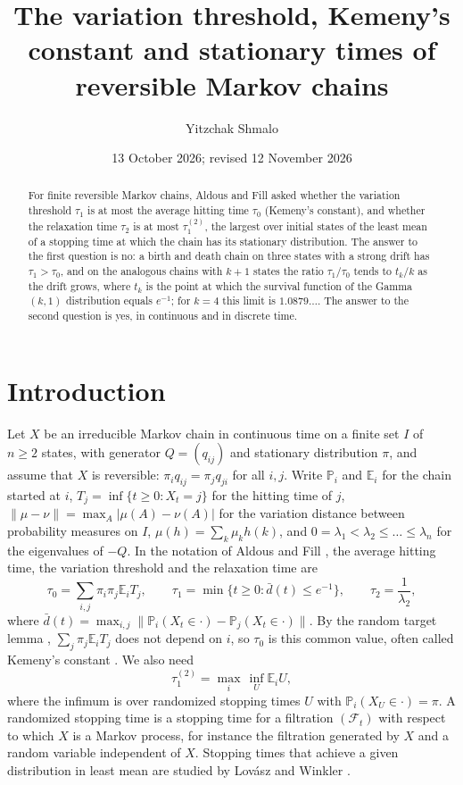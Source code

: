 \documentclass[11pt]{amsart}
\title[The variation threshold and stationary times]{The variation threshold, Kemeny's constant and stationary times of reversible Markov chains}
\author{Yitzchak Shmalo}
\date{13 October 2026; revised 12 November 2026}
\numberwithin{equation}{section}
\newcommand{\Pp}{\mathbb P}
\newcommand{\E}{\mathbb E}
\newcommand{\dbar}{\bar d}
\begin{document}
\begin{abstract}
For finite reversible Markov chains, Aldous and Fill asked whether the variation threshold $\tau_1$ is at most the average hitting time $\tau_0$ (Kemeny's constant), and whether the relaxation time $\tau_2$ is at most $\tau_1^{(2)}$, the largest over initial states of the least mean of a stopping time at which the chain has its stationary distribution. The answer to the first question is no: a birth and death chain on three states with a strong drift has $\tau_1>\tau_0$, and on the analogous chains with $k+1$ states the ratio $\tau_1/\tau_0$ tends to $t_k/k$ as the drift grows, where $t_k$ is the point at which the survival function of the Gamma$(k,1)$ distribution equals $e^{-1}$; for $k=4$ this limit is $1.0879\ldots$. The answer to the second question is yes, in continuous and in discrete time.
\end{abstract}
\maketitle

\section{Introduction}

Let $X$ be an irreducible Markov chain in continuous time on a finite set $I$ of $n\ge2$ states, with generator $Q=(q_{ij})$ and stationary distribution $\pi$, and assume that $X$ is reversible: $\pi_iq_{ij}=\pi_jq_{ji}$ for all $i,j$. Write $\Pp_i$ and $\E_i$ for the chain started at $i$, $T_j=\inf\{t\ge0:X_t=j\}$ for the hitting time of $j$, $\|\mu-\nu\|=\max_A|\mu(A)-\nu(A)|$ for the variation distance between probability measures on $I$, $\mu(h)=\sum_k\mu_kh(k)$, and $0=\lambda_1<\lambda_2\le\dots\le\lambda_n$ for the eigenvalues of $-Q$. In the notation of Aldous and Fill \cite[Chapter~4]{AF}, the average hitting time, the variation threshold and the relaxation time are
\[
\tau_0=\sum_{i,j}\pi_i\pi_j\E_iT_j,\qquad \tau_1=\min\{t\ge0:\dbar(t)\le e^{-1}\},\qquad \tau_2=\frac1{\lambda_2},
\]
where $\dbar(t)=\max_{i,j}\|\Pp_i(X_t\in\cdot)-\Pp_j(X_t\in\cdot)\|$. By the random target lemma \cite[Corollary~2.14]{AF}, $\sum_j\pi_j\E_iT_j$ does not depend on $i$, so $\tau_0$ is this common value, often called Kemeny's constant \cite{KS60}. We also need
\[
\tau_1^{(2)}=\max_i\,\inf_U\E_iU,
\]
where the infimum is over randomized stopping times $U$ with $\Pp_i(X_U\in\cdot)=\pi$. A randomized stopping time is a stopping time for a filtration $(\mathcal F_t)$ with respect to which $X$ is a Markov process, for instance the filtration generated by $X$ and a random variable independent of $X$. Stopping times that achieve a given distribution in least mean are studied by Lovász and Winkler \cite{LW95}.
\end{document}
